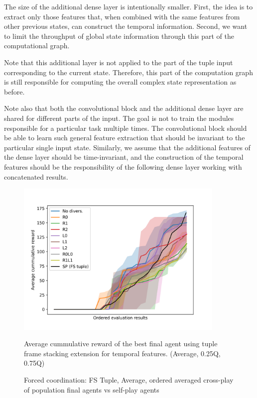 The size of the additional dense layer is intentionally smaller.
First, the idea is to extract only those features that, when combined with the same features from other previous states, can construct the temporal information.
Second, we want to limit the throughput of global state information through this part of the computational graph.

Note that this additional layer is not applied to the part of the tuple input corresponding to the current state.
Therefore, this part of the computation graph is still responsible for computing the overall complex state representation as before.

Note also that both the convolutional block and the additional dense layer are shared for different parts of the input.
The goal is not to train the modules responsible for a particular task multiple times.
The convolutional block should be able to learn such general feature extraction that should be invariant to the particular single input state.
Similarly, we assume that the additional features of the dense layer should be time-invariant, and the construction of the temporal features should be the responsibility of the following dense layer working with concatenated results.

\begin{figure}[!ht]
    \centering
    \includegraphics*[width=10cm]{../img/FSTupleOrderedAvg.png}

    \caption{Forced coordination: FS Tuple, Average, ordered averaged cross-play of population final agents vs self-play agents}
    \label{FSTupleOrderedAvg}
    \medskip
    \small 
    Average cummulative reward of the best final agent using tuple frame stacking extension for temporal features.    
    (Average, 0.25Q, 0.75Q)

\end{figure}

